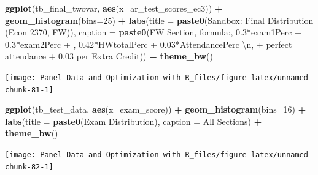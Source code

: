 \documentclass[
]{book}
\newenvironment{Shaded}{\begin{snugshade}}{\end{snugshade}}
\newcommand{\CharTok}[1]{\textcolor[rgb]{0.31,0.60,0.02}{#1}}
\newcommand{\DataTypeTok}[1]{\textcolor[rgb]{0.13,0.29,0.53}{#1}}
\newcommand{\DecValTok}[1]{\textcolor[rgb]{0.00,0.00,0.81}{#1}}
\newcommand{\KeywordTok}[1]{\textcolor[rgb]{0.13,0.29,0.53}{\textbf{#1}}}
\newcommand{\NormalTok}[1]{#1}
\newcommand{\OperatorTok}[1]{\textcolor[rgb]{0.81,0.36,0.00}{\textbf{#1}}}
\newcommand{\StringTok}[1]{\textcolor[rgb]{0.31,0.60,0.02}{#1}}
\begin{document}
\begin{Shaded}
\begin{Highlighting}[]
\KeywordTok{ggplot}\NormalTok{(tb\_final\_twovar, }\KeywordTok{aes}\NormalTok{(}\DataTypeTok{x=}\NormalTok{ar\_test\_scores\_ec3)) }\OperatorTok{+}
\StringTok{  }\KeywordTok{geom\_histogram}\NormalTok{(}\DataTypeTok{bins=}\DecValTok{25}\NormalTok{) }\OperatorTok{+}
\StringTok{  }\KeywordTok{labs}\NormalTok{(}\DataTypeTok{title =} \KeywordTok{paste0}\NormalTok{(}\StringTok{\textquotesingle{}Sandbox: Final Distribution (Econ 2370, FW)\textquotesingle{}}\NormalTok{),}
       \DataTypeTok{caption =} \KeywordTok{paste0}\NormalTok{(}\StringTok{\textquotesingle{}FW Section, formula:\textquotesingle{}}\NormalTok{,}
                        \StringTok{\textquotesingle{}0.3*exam1Perc + 0.3*exam2Perc + \textquotesingle{}}\NormalTok{,}
                        \StringTok{\textquotesingle{}0.42*HWtotalPerc + 0.03*AttendancePerc }\CharTok{\textbackslash{}n}\StringTok{\textquotesingle{}}\NormalTok{,}
                        \StringTok{\textquotesingle{}+ perfect attendance + 0.03 per Extra Credit\textquotesingle{}}\NormalTok{)) }\OperatorTok{+}
\StringTok{  }\KeywordTok{theme\_bw}\NormalTok{()}
\end{Highlighting}
\end{Shaded}

\begin{center}\texttt{[image: Panel-Data-and-Optimization-with-R\_files/figure-latex/unnamed-chunk-81-1]} \end{center}

\begin{Shaded}
\begin{Highlighting}[]
\KeywordTok{ggplot}\NormalTok{(tb\_test\_data, }\KeywordTok{aes}\NormalTok{(}\DataTypeTok{x=}\NormalTok{exam\_score)) }\OperatorTok{+}
\StringTok{  }\KeywordTok{geom\_histogram}\NormalTok{(}\DataTypeTok{bins=}\DecValTok{16}\NormalTok{) }\OperatorTok{+}
\StringTok{  }\KeywordTok{labs}\NormalTok{(}\DataTypeTok{title =} \KeywordTok{paste0}\NormalTok{(}\StringTok{\textquotesingle{}Exam Distribution\textquotesingle{}}\NormalTok{),}
       \DataTypeTok{caption =} \StringTok{\textquotesingle{}All Sections\textquotesingle{}}\NormalTok{) }\OperatorTok{+}
\StringTok{  }\KeywordTok{theme\_bw}\NormalTok{()}
\end{Highlighting}
\end{Shaded}

\begin{center}\texttt{[image: Panel-Data-and-Optimization-with-R\_files/figure-latex/unnamed-chunk-82-1]} \end{center}
\end{document}

